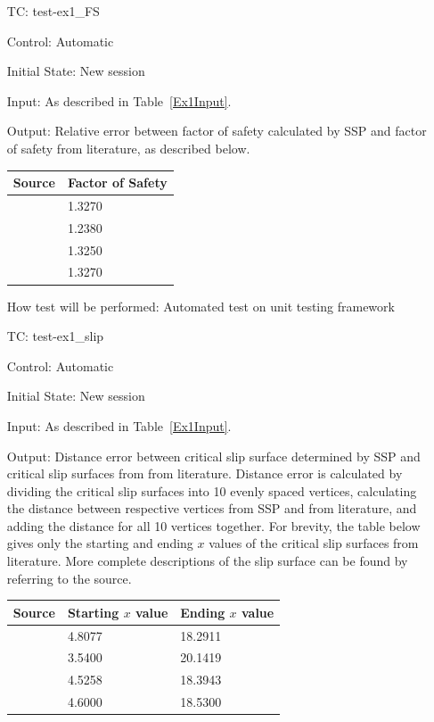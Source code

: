\documentclass[12pt, titlepage]{article}
\newcounter{testnum} %
\newcommand{\progname}{SSP}
\begin{document}
\begin{enumerate}[label=TC\arabic*:,ref={\arabic*}]
	
\item [TC\refstepcounter{testnum}\thetestnum: \label{TC_Ex1FS}] test-ex1\_FS

Control: Automatic

Initial State: New session

Input: As described in Table~\ref{Ex1Input}.

Output: Relative error between factor of safety calculated by \progname{} and 
factor of safety from literature, as described below. \newline
\begin{tabularx}{1.0\textwidth}{p{7cm} l}
	\toprule \textbf{Source} & \textbf{Factor of Safety}\\ \midrule
	\cite{Greco1996} & 1.3270\\
	\cite{MalkawiEtAl} & 1.2380\\
	\cite{ChengEtAl} & 1.3250\\
	\cite{LiEtAl} & 1.3270\\
	\bottomrule
\end{tabularx}

How test will be performed: Automated test on unit testing framework

\item [TC\refstepcounter{testnum}\thetestnum: \label{TC_Ex1Slip}] test-ex1\_slip

Control: Automatic

Initial State: New session

Input: As described in Table~\ref{Ex1Input}.

Output: Distance error between critical slip surface determined by \progname{} 
and critical slip surfaces from from literature. Distance error is calculated 
by dividing the critical slip surfaces into 10 evenly spaced vertices, 
calculating the distance between respective vertices from \progname{} and from 
literature, and adding the distance for all 10 vertices together. For brevity, 
the table below gives only the starting and ending $x$ values of the critical 
slip surfaces from literature. More complete descriptions of the slip surface 
can be found by referring to the source. \newline
\begin{tabularx}{1.0\textwidth}{l p{3.5cm} p{3.5cm}}
	\toprule \textbf{Source} & \textbf{Starting $x$ value} & 
	\textbf{Ending $x$ value}\\ \midrule
	\cite{Greco1996} & 4.8077 & 18.2911\\
	\cite{MalkawiEtAl} & 3.5400 & 20.1419\\
	\cite{ChengEtAl} & 4.5258 & 18.3943\\
	\cite{LiEtAl} & 4.6000 & 18.5300\\
	\bottomrule
\end{tabularx}


\end{enumerate}
\end{document}

